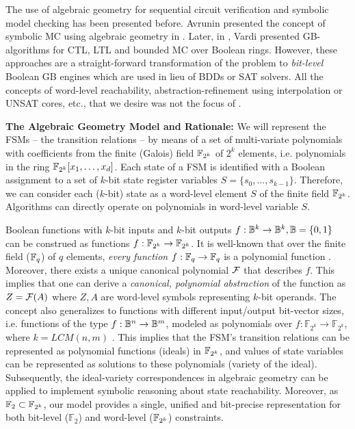 The use of algebraic geometry
for sequential circuit verification and symbolic model checking has
been presented before. Avrunin presented the
concept of symbolic MC using algebraic geometry in
\cite{Avrunin:CAV}. Later, in \cite{vardi-iasted07}, Vardi presented
GB-algorithms for CTL, LTL and 
bounded MC over Boolean rings. However, these approaches are a
straight-forward transformation of the problem to {\it bit-level}
Boolean GB engines which are used in lieu of BDDs or SAT solvers. All
the concepts of word-level reachability, abstraction-refinement using
interpolation or UNSAT cores, etc., that we desire was not the focus of
\cite{Avrunin:CAV} \cite{vardi-iasted07}. 

{\bf The Algebraic Geometry Model and Rationale:} We will represent
the FSMs -- the transition relations -- by means of a set of
multi-variate polynomials with coefficients from the finite (Galois)
field ${\mathbb{F}}_{2^k}$ of $2^k$ elements, i.e. polynomials in the ring
${\mathbb{F}}_{2^k}[x_1,\dots,x_d]$. Each state of a FSM is identified with a
Boolean assignment to a set of $k$-bit state register variables
$S=\{s_0,\dots,s_{k-1}\}$. Therefore, we can consider each ($k$-bit)
state as a word-level element $S$ of the finite field
${\mathbb{F}}_{2^k}$. Algorithms can directly operate on polynomials in word-level
variable $S$. 

Boolean functions with $k$-bit inputs and $k$-bit outputs 
$f: {\mathbb{B}}^k \rightarrow {\mathbb{B}}^k,{\mathbb{B}} = \{0, 1\}$ can be construed as functions
$f: {\mathbb{F}}_{2^k} \rightarrow {\mathbb{F}}_{2^k}$. It is well-known that over the finite
field (${\mathbb{F}}_{q}$) of  $q$ elements, {\it every function} $f: {\mathbb{F}}_{q}
\rightarrow {\mathbb{F}}_{q}$ is a polynomial function \cite{ff:1997}. Moreover,
there exists a unique canonical polynomial ${\mathcal{F}}$ that describes $f$.
This implies that one can derive a {\it  canonical, polynomial
  abstraction} of the function as $Z = {\mathcal{F}}(A)$ where $Z, A$ are
word-level symbols representing $k$-bit operands. The concept also
generalizes to functions with different input/output bit-vector sizes,
i.e. functions of the type $f: {\mathbb{B}}^n \rightarrow {\mathbb{B}}^m$, modeled as
polynomials over $f:{\mathbb{F}}_{2^k} \rightarrow
{\mathbb{F}}_{2^k}$, where $k=LCM(n,m)$ \cite{ff:1997}.  
This implies that the FSM's transition relations can be
represented as polynomial functions (ideals) in ${\mathbb{F}}_{2^k}$, and values of
state variables can be represented as solutions to these polynomials
(variety of the ideal). Subsequently, the ideal-variety correspondences
in algebraic geometry can be applied to implement symbolic reasoning
about state reachability. Moreover, as ${\mathbb{F}}_2 \subset {\mathbb{F}}_{2^k}$,
our model provides a single, unified and bit-precise representation
for both bit-level (${\mathbb{F}}_2$) and word-level (${\mathbb{F}}_{2^k}$)
constraints.  

